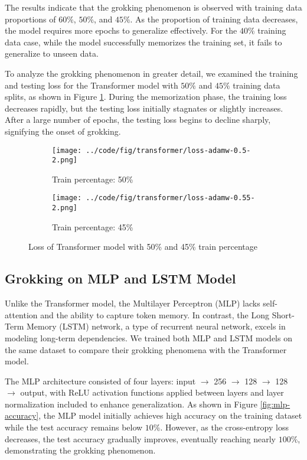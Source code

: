 \documentclass{article}
\begin{document}
The results indicate that the grokking phenomenon is observed with training data proportions of $60\%$, $50\%$, and $45\%$. As the proportion of training data decreases, the model requires more epochs to generalize effectively. For the $40\%$ training data case, while the model successfully memorizes the training set, it fails to generalize to unseen data.

To analyze the grokking phenomenon in greater detail, we examined the training and testing loss for the Transformer model with $50\%$ and $45\%$ training data splits, as shown in Figure \ref{fig:transformer-loss}. During the memorization phase, the training loss decreases rapidly, but the testing loss initially stagnates or slightly increases. After a large number of epochs, the testing loss begins to decline sharply, signifying the onset of grokking.

\begin{figure}[ht]
    \centering
    \begin{subfigure}{0.45\textwidth}
        \texttt{[image: ../code/fig/transformer/loss-adamw-0.5-2.png]}
        \caption{Train percentage: 50\%}
    \end{subfigure}
    \begin{subfigure}{0.45\textwidth}
        \texttt{[image: ../code/fig/transformer/loss-adamw-0.55-2.png]}
        \caption{Train percentage: 45\%}
    \end{subfigure}
    \caption{Loss of Transformer model with 50\% and 45\% train percentage}
    \label{fig:transformer-loss}
\end{figure}

\subsection{Grokking on MLP and LSTM Model}

Unlike the Transformer model, the Multilayer Perceptron (MLP) lacks self-attention and the ability to capture token memory. In contrast, the Long Short-Term Memory (LSTM) network, a type of recurrent neural network, excels in modeling long-term dependencies. We trained both MLP and LSTM models on the same dataset to compare their grokking phenomena with the Transformer model.

The MLP architecture consisted of four layers: input $\rightarrow$ 256 $\rightarrow$ 128 $\rightarrow$ 128 $\rightarrow$ output, with ReLU activation functions applied between layers and layer normalization included to enhance generalization. As shown in Figure \ref{fig:mlp-accuracy}, the MLP model initially achieves high accuracy on the training dataset while the test accuracy remains below $10\%$. However, as the cross-entropy loss decreases, the test accuracy gradually improves, eventually reaching nearly $100\%$, demonstrating the grokking phenomenon.
\end{document}
